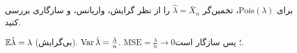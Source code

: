 \begin{exercise}
برای $\mathrm{Pois}(\lambda)$، تخمین‌گر $\hat\lambda=\bar X_n$ را از نظر گرایش، واریانس،  و سازگاری بررسی کنید.
\end{exercise}
\begin{solution}
$\mathbb{E}\hat\lambda=\lambda$ (بی‌گرایش). $\operatorname{Var}\hat\lambda=\frac{\lambda}{n}$. $\mathrm{MSE}=\frac\lambda n\to0$؛ پس سازگار است.
\end{solution}

